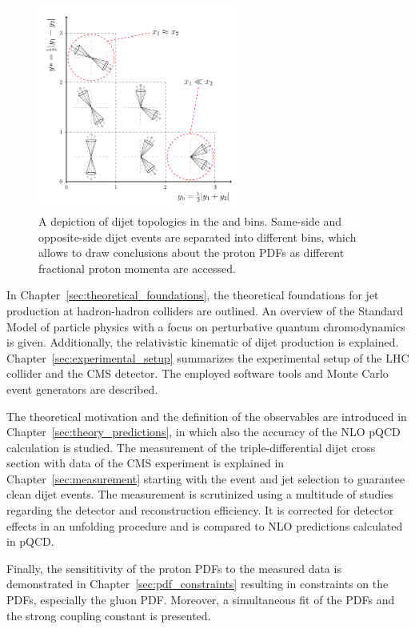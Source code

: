 \begin{figure}[h!tb]
    \centering
    \includegraphics[width=0.6\textwidth]{figures/drawings/ybys_hint.pdf}
    \caption{A depiction of dijet topologies in the \ystar and \yboost bins.
             Same-side and opposite-side dijet events are separated into
             different bins, which allows to draw conclusions about the proton
             PDFs as different fractional proton momenta are accessed.}
    \label{fig:intro_ybys_hint}
\end{figure}

In Chapter~\ref{sec:theoretical_foundations}, the theoretical foundations for
jet production at hadron-hadron colliders are outlined. An overview of the
Standard Model of particle physics with a focus on perturbative quantum
chromodynamics is given. Additionally, the relativistic kinematic of dijet
production is explained. Chapter~\ref{sec:experimental_setup} summarizes the
experimental setup of the LHC collider and the CMS detector. The
employed software tools and Monte Carlo event generators are described.

The theoretical motivation and the definition of the observables are introduced
in Chapter~\ref{sec:theory_predictions}, in which also the accuracy of the NLO
pQCD calculation is studied. The measurement of the triple-differential dijet
cross section with data of the CMS experiment is explained in
Chapter~\ref{sec:measurement} starting with the event and jet selection to
guarantee clean dijet events. The measurement is scrutinized using a multitude
of studies regarding the detector and reconstruction efficiency. It is corrected
for detector effects in an unfolding procedure and is compared to NLO
predictions calculated in pQCD.

Finally, the sensititivity of the proton PDFs to the measured data is
demonstrated in Chapter~\ref{sec:pdf_constraints} resulting in constraints on
the PDFs, especially the gluon PDF. Moreover, a simultaneous fit of the PDFs and
the strong coupling constant is presented.

